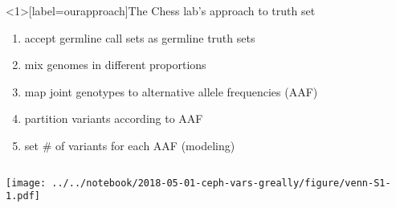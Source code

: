\documentclass{beamer}
\begin{document}
\begin{frame}<1>[label=ourapproach]{The Chess lab's approach to truth set}
\begin{enumerate}
\item<1> accept germline call sets as germline truth sets
\item<2> mix genomes in different proportions 
\item<3> map joint genotypes to alternative allele frequencies (AAF) 
\item<3> partition variants according to AAF 
\item<4-> set \# of variants for each AAF (modeling)
\end{enumerate}
\begin{columns}[t]
\begin{column}{0.5\textwidth}

\texttt{[image: ../../notebook/2018-05-01-ceph-vars-greally/figure/venn-S1-1.pdf]}
\end{column}

\begin{column}{0.5\textwidth}

{\tiny
{}
\vfill
{}
}
\end{column}
\end{columns}
\end{frame}
\end{document}
